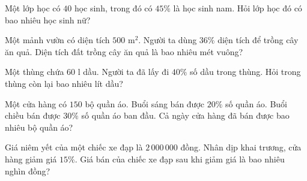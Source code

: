 \begin{ex} %
Một lớp học có $40$ học sinh, trong đó có $45\%$ là học sinh nam. Hỏi lớp học đó có bao nhiêu học sinh nữ?
\end{ex}

\begin{ex} %
Một mảnh vườn có diện tích $500\text{ m}^2$. Người ta dùng $36\%$ diện tích để trồng cây ăn quả. Diện tích đất trồng cây ăn quả là bao nhiêu mét vuông?
\end{ex}

\begin{ex} %
Một thùng chứa $60\text{ l}$ dầu. Người ta đã lấy đi $40\%$ số dầu trong thùng. Hỏi trong thùng còn lại bao nhiêu lít dầu?
\end{ex}

\begin{ex} %
Một cửa hàng có $150$ bộ quần áo. Buổi sáng bán được $20\%$ số quần áo. Buổi chiều bán được $30\%$ số quần áo ban đầu. Cả ngày cửa hàng đã bán được bao nhiêu bộ quần áo?
\end{ex}

\begin{ex} %
Giá niêm yết của một chiếc xe đạp là $2\,000\,000$ đồng. Nhân dịp khai trương, cửa hàng giảm giá $15\%$. Giá bán của chiếc xe đạp sau khi giảm giá là bao nhiêu nghìn đồng?
\end{ex}
